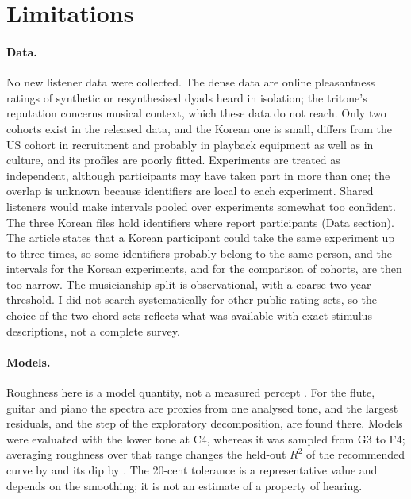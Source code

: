 \documentclass[11pt,a4paper]{article}
\begin{document}
\section{Limitations}
\label{sec:limitations}

\paragraph{Data.}
No new listener data were collected. The dense data are online pleasantness ratings of
synthetic or resynthesised dyads heard in isolation; the tritone's reputation concerns musical
context, which these data do not reach. Only two cohorts exist in the released data, and the
Korean one is small, differs from the US cohort in recruitment and probably in playback
equipment as well as in culture, and its profiles are poorly fitted. Experiments are treated
as independent, although participants may have taken part in more than one; the overlap is
unknown because identifiers are local to each experiment. Shared listeners would make
intervals pooled over experiments somewhat too confident. The three Korean files hold
\nKRListeners{} identifiers where \citet{marjieh2024} report \nArtKorean{} participants
(Data section). The article states that a Korean participant could take the same
experiment up to three times, so some identifiers probably belong to the same person, and
the intervals for the Korean experiments, and for the comparison of cohorts, are then too
narrow. The musicianship split is
observational, with a coarse two-year threshold. I did not search systematically for other
public rating sets, so the choice of the two chord sets reflects what was available with
exact stimulus descriptions, not a complete survey.

\paragraph{Models.}
Roughness here is a model quantity, not a measured percept \citep{mcbride2025}. For the flute,
guitar and piano the spectra are proxies from one analysed tone, and the largest residuals,
and the step of the exploratory decomposition, are found there. Models were evaluated with
the lower tone at C4, whereas it was sampled from G3 to F4; averaging roughness over that
range changes the held-out $R^2$ of the recommended curve by \rbdRtwoRegVsHKHtw{} and its dip
by \rbdDipRegVsHKHtw. The 20-cent tolerance is a representative value and depends on the
smoothing; it is not an estimate of a property of hearing.
\end{document}
